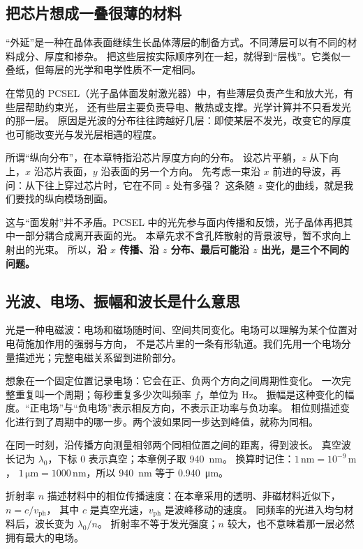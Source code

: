 \subsection{把芯片想成一叠很薄的材料}
“外延”是一种在晶体表面继续生长晶体薄层的制备方式。不同薄层可以有不同的材料成分、厚度和掺杂。
把这些层按实际顺序列在一起，就得到“层栈”。它类似一叠纸，但每层的光学和电学性质不一定相同。

在常见的 PCSEL（光子晶体面发射激光器）中，有些薄层负责产生和放大光，有些层帮助约束光，
还有些层主要负责导电、散热或支撑。光学计算并不只看发光的那一层。
原因是光波的分布往往跨越好几层：即使某层不发光，改变它的厚度也可能改变光与发光层相遇的程度。

所谓“纵向分布”，在本章特指沿芯片厚度方向的分布。
设芯片平躺，$z$ 从下向上，$x$ 沿芯片表面，$y$ 沿表面的另一个方向。
先考虑一束沿 $x$ 前进的导波，再问：从下往上穿过芯片时，它在不同 $z$ 处有多强？
这条随 $z$ 变化的曲线，就是我们要找的纵向模场剖面。

这与“面发射”并不矛盾。PCSEL 中的光先参与面内传播和反馈，光子晶体再把其中一部分耦合成离开表面的光。
本章先求不含孔阵散射的背景波导，暂不求向上射出的光束。
所以，\textbf{沿 $x$ 传播、沿 $z$ 分布、最后可能沿 $z$ 出光，是三个不同的问题。}

\subsection{光波、电场、振幅和波长是什么意思}
光是一种电磁波：电场和磁场随时间、空间共同变化。电场可以理解为某个位置对电荷施加作用的强弱与方向，
不是芯片里的一条有形轨道。我们先用一个电场分量描述光；完整电磁关系留到进阶部分。

想象在一个固定位置记录电场：它会在正、负两个方向之间周期性变化。
一次完整重复叫一个周期；每秒重复多少次叫频率 $f$，单位为 Hz。
振幅是这种变化的幅度。“正电场”与“负电场”表示相反方向，不表示正功率与负功率。
相位则描述变化进行到了周期中的哪一步。两个波如果同一步达到峰值，就称为同相。

在同一时刻，沿传播方向测量相邻两个同相位置之间的距离，得到波长。
真空波长记为 $\lambda_0$，下标 0 表示真空；本章例子取 \SI{940}{nm}。
换算时记住：$1\,\mathrm{nm}=10^{-9}\,\mathrm m$，
$1\,\mathrm{\mu m}=1000\,\mathrm{nm}$，所以 \SI{940}{nm} 等于 \SI{0.940}{\micro\meter}。

折射率 $n$ 描述材料中的相位传播速度：在本章采用的透明、非磁材料近似下，$n=c/v_{\mathrm{ph}}$，
其中 $c$ 是真空光速，$v_{\mathrm{ph}}$ 是波峰移动的速度。
同频率的光进入均匀材料后，波长变为 $\lambda_0/n$。
折射率不等于发光强度；$n$ 较大，也不意味着那一层必然拥有最大的电场。

